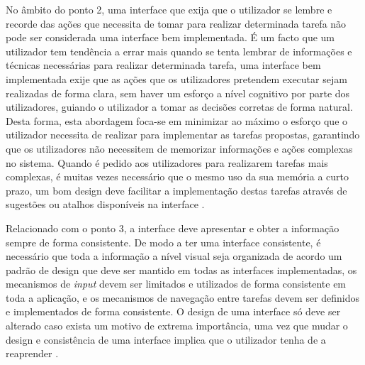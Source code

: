 No âmbito do ponto 2, uma interface que exija que o utilizador se lembre e recorde das ações que necessita de tomar para realizar determinada tarefa não pode ser considerada uma interface bem implementada. É um facto que um utilizador tem tendência a errar mais quando se tenta lembrar de informações e técnicas necessárias para realizar determinada tarefa, uma interface bem implementada exije que as ações que os utilizadores pretendem executar sejam realizadas de forma clara, sem haver um esforço a nível cognitivo por parte dos utilizadores, guiando o utilizador a tomar as decisões corretas de forma natural. Desta forma, esta abordagem foca-se em minimizar ao máximo o esforço que o utilizador necessita de realizar para implementar as tarefas propostas, garantindo que os utilizadores não necessitem de memorizar informações e ações complexas no sistema. Quando é pedido aos utilizadores para realizarem tarefas mais complexas, é muitas vezes necessário que o mesmo uso da sua memória a curto prazo, um bom design deve facilitar a implementação destas tarefas através de sugestões ou atalhos disponíveis na interface \cite{sridevi2014user}.

Relacionado com o ponto 3, a interface deve apresentar e obter a informação sempre de forma consistente. De modo a ter uma interface consistente, é necessário que toda a informação a nível visual seja organizada de acordo um padrão de design que deve ser mantido em todas as interfaces implementadas, os mecanismos de \textit{input} devem ser limitados e utilizados de forma consistente em toda a aplicação, e os mecanismos de navegação entre tarefas devem ser definidos e implementados de forma consistente. O design de uma interface só deve ser alterado caso exista um motivo de extrema importância, uma vez que mudar o design e consistência de uma interface implica que o utilizador tenha de a reaprender \cite{sridevi2014user}.



